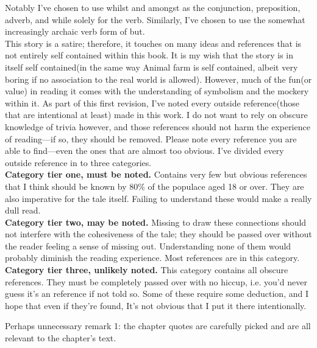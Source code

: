 \documentclass[smalldemyvopaper,11pt,twoside,onecolumn,openright,extrafontsizes]{memoir}
\begin{document}
Notably I've chosen to use whilst and amongst as the conjunction, preposition, adverb, and while solely for the verb. Similarly, I've chosen to use the somewhat increasingly archaic verb form of but. \\

This story is a satire; therefore, it touches on many ideas and references that is not entirely self contained within this book. It is my wish that the story is in itself self contained(in the same way Animal farm is self contained, albeit very boring if no association to the real world is allowed). However, much of the fun(or value) in reading it comes with the understanding of symbolism and the mockery within it. 
As part of this first revision, I've noted every outside reference(those that are intentional at least) made in this work. I do not want to rely on obscure knowledge of trivia however, and those references should not harm the experience of reading---if so, they should be removed. Please note every reference you are able to find---even the ones that are almost too obvious.
I've divided every outside reference in to three categories.\\[1cm]

\textbf{Category tier one, must be noted.}
Contains very few but obvious references that I think should be known by 80\% of the populace aged 18 or over. They are also imperative for the tale itself. Failing to understand these would make a really dull read.\\[1cm]

\textbf{Category tier two, may be noted.}
Missing to draw these connections should not interfere with the cohesiveness of the tale; they should be passed over without the reader feeling a sense of missing out. Understanding none of them would probably diminish the reading experience.
Most references are in this category.\\[1cm]
 
\textbf{Category tier three, unlikely noted.} 
This category contains all obscure references. They must be completely passed over with no hiccup, i.e. you'd never guess it's an reference if not told so. Some of these require some deduction, and I hope that even if they're found, It's not obvious that I put it there intentionally.

Perhaps unnecessary remark 1: the chapter quotes are carefully picked and are all relevant to the chapter's text.
\end{document}

